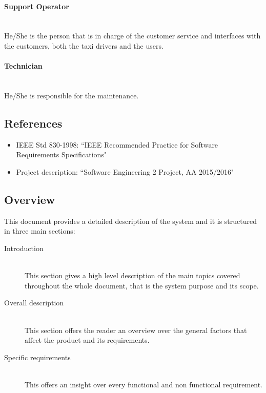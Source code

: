 \paragraph{Support Operator} \hfill \\
\label{def:operator} He/She is the person that is in charge of the customer service and interfaces with the customers, both the taxi drivers and the users.

\paragraph{Technician} \hfill \\
\label{def:technician} He/She is responsible for the maintenance.


\subsection{References}
\begin{itemize}
\item IEEE Std 830-1998: ``IEEE Recommended Practice for Software Requirements Specifications"
\item Project description: ``Software Engineering 2 Project, AA 2015/2016"
\end{itemize}


\subsection{Overview}
This document provides a detailed description of the system and it is structured in three main sections:

\begin{description}
  \item[Introduction] \hfill \\
  This section gives a high level description of the main topics covered throughout the whole document, that is the system purpose and its scope.
  \item[Overall description] \hfill \\
  This section offers the reader an overview over the general factors that affect the product and its requirements.
  \item[Specific requirements] \hfill \\
  This offers an insight over every functional and non functional requirement.
\end{description}
